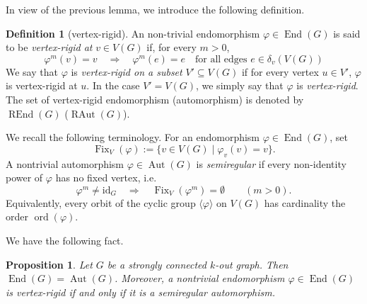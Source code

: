 \documentclass[a4paper,10pt]{amsart}
\theoremstyle{plain}
\newtheorem{proposition}[theorem]{Proposition}
\theoremstyle{definition}
\newtheorem{definition}[theorem]{Definition}
\DeclareMathOperator{\Aut}{Aut}
\DeclareMathOperator{\Fix}{Fix}
\DeclareMathOperator{\End}{End}
\DeclareMathOperator{\REnd}{REnd}
\DeclareMathOperator{\RAut}{RAut}
\newcommand{\id}{\mathrm{id}}
\begin{document}
In view of the previous lemma, we introduce the following definition.

\begin{definition}[vertex-rigid]
An non-trivial endomorphism $\varphi \in \End(G)$ is said to be \emph{vertex-rigid at} $v\in V(G)$ if, for every $m>0$,
\[
\varphi^{m}(v)=v
\quad\Longrightarrow\quad
\varphi^{m}(e)=e
\quad \text{for all edges } e \in \delta_v(V(G))
\] 
We say that $\varphi$ is \emph{vertex-rigid on a subset} $V'\subseteq V(G)$ if for every vertex $u\in V'$, $\varphi$ is vertex-rigid at $u$. In the case $V'=V(G)$, we simply say that $\varphi$ is \emph{vertex-rigid}. The set of vertex-rigid endomorphism (automorphism) is denoted by $\REnd(G)$ ($\RAut(G)$). 
\end{definition}
We recall the following terminology. For an endomorphism $\varphi\in\End(G)$, set
\[
\Fix_V(\varphi):=\{v\in V(G)\mid \varphi_v(v)=v\}.
\]
A nontrivial automorphism $\varphi\in\Aut(G)$ is \emph{semiregular} if every non-identity power of $\varphi$ has no fixed vertex, i.e.\
\[
\varphi^m\neq \id_G \quad\Longrightarrow\quad \Fix_V(\varphi^m)=\emptyset
\qquad (m>0).
\]
Equivalently, every orbit of the cyclic group $\langle\varphi\rangle$ on $V(G)$ has cardinality the order $\operatorname{ord}(\varphi)$. 

We have the following fact.

\begin{proposition}\label{prop:vertex-rigid-semiregular}
Let $G$ be a strongly connected $k$-out graph. Then $\End(G)=\Aut(G)$.
Moreover, a nontrivial endomorphism $\varphi\in\End(G)$ is vertex-rigid if and only if it is a semiregular automorphism.
\end{proposition}
\end{document}
